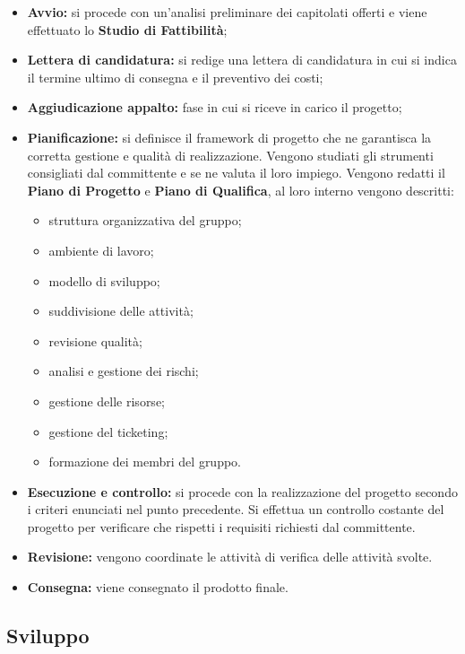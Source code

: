 \begin{itemize}
    \item \textbf{Avvio:} si procede con un'analisi preliminare dei capitolati offerti e viene effettuato lo \textbf{Studio di Fattibilità};
    \item \textbf{Lettera di candidatura:} si redige una lettera di candidatura in cui si indica il termine ultimo di consegna e il preventivo dei costi;
    \item \textbf{Aggiudicazione appalto:} fase in cui si riceve in carico il progetto;
    \item \textbf{Pianificazione:} si definisce il framework di progetto che ne garantisca la corretta gestione e qualità di realizzazione. Vengono studiati gli strumenti consigliati dal committente e se ne valuta il loro impiego. Vengono redatti il \textbf{Piano di Progetto} e \textbf{Piano di Qualifica}, al loro interno vengono descritti:
          \begin{itemize}
              \item {struttura organizzativa del gruppo;}
              \item {ambiente di lavoro;}
              \item {modello di sviluppo;}
              \item {suddivisione delle attività;}
              \item {revisione qualità;}
              \item {analisi e gestione dei rischi;}
              \item {gestione delle risorse;}
              \item {gestione del ticketing;}
              \item {formazione dei membri del gruppo.}
          \end{itemize}
    \item \textbf{Esecuzione e controllo:} si procede con la realizzazione del progetto secondo i criteri enunciati nel punto precedente. Si effettua un controllo costante del progetto per verificare che rispetti i requisiti richiesti dal committente.
    \item \textbf{Revisione:} vengono coordinate le attività di verifica delle attività svolte.
    \item \textbf{Consegna:} viene consegnato il prodotto finale.
\end{itemize}
\subsection{Sviluppo}
